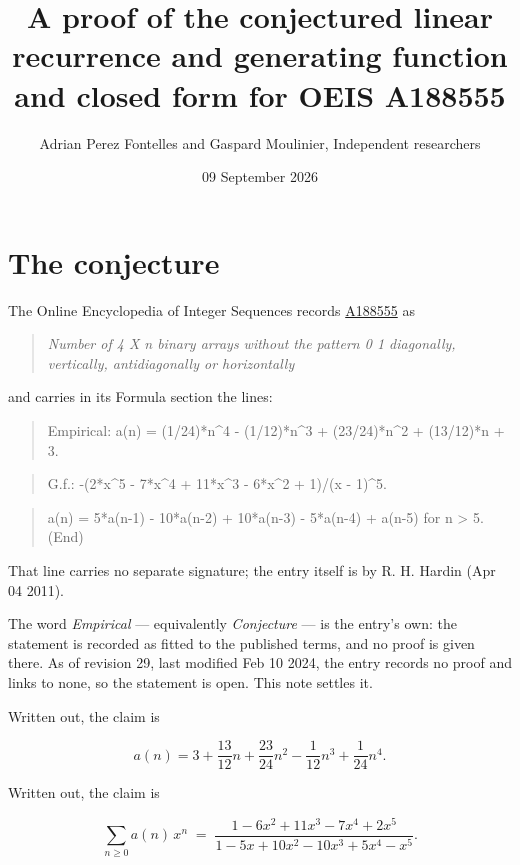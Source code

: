 \documentclass[11pt]{article}
\title{A proof of the conjectured linear recurrence and generating function and closed form for OEIS A188555}
\author{Adrian Perez Fontelles and Gaspard Moulinier, Independent researchers}
\date{09 September 2026}
\theoremstyle{definition}
\begin{document}
\maketitle
\section{The conjecture}

The Online Encyclopedia of Integer Sequences records \href{https://oeis.org/A188555}{A188555} as

\begin{quote}\itshape Number of 4 X n binary arrays without the pattern 0 1 diagonally, vertically, antidiagonally or horizontally\end{quote}

and carries in its Formula section the lines:

\begin{quote}\ttfamily Empirical: a(n) = (1/24)*n\textasciicircum{}4 - (1/12)*n\textasciicircum{}3 + (23/24)*n\textasciicircum{}2 + (13/12)*n + 3.\end{quote}

\begin{quote}\ttfamily G.f.: -(2*x\textasciicircum{}5 - 7*x\textasciicircum{}4 + 11*x\textasciicircum{}3 - 6*x\textasciicircum{}2 + 1)/(x - 1)\textasciicircum{}5.\end{quote}

\begin{quote}\ttfamily a(n) = 5*a(n-1) - 10*a(n-2) + 10*a(n-3) - 5*a(n-4) + a(n-5) for n > 5. (End)\end{quote}

That line carries no separate signature; the entry itself is by R. H. Hardin (Apr 04 2011).

The word {\itshape Empirical} --- equivalently {\itshape Conjecture} --- is the entry's own: the statement is recorded as fitted to the published terms, and no proof is given there. As of revision 29, last modified Feb 10 2024, the entry records no proof and links to none, so the statement is open. This note settles it.

Written out, the claim is

\[a(n) = 3 + \frac{13}{12}n + \frac{23}{24}n^{2} - \frac{1}{12}n^{3} + \frac{1}{24}n^{4}.\]

Written out, the claim is

\[\sum_{n \ge 0} a(n)\,x^n \;=\; \frac{1 - 6x^{2} + 11x^{3} - 7x^{4} + 2x^{5}}{1 - 5x + 10x^{2} - 10x^{3} + 5x^{4} - x^{5}}.\]
\end{document}

